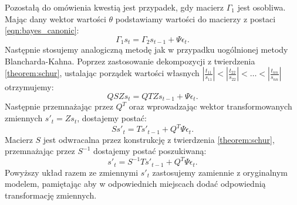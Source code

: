 Pozostałą do omówienia kwestią jest przypadek, gdy macierz $\Gamma_1$  jest osobliwa. Mając dany wektor wartości $\theta$ podstawiamy wartości do macierzy z postaci \eqref{eqn:bayes_canonic}:
\begin{equation}
    \Gamma_1 s_t = \Gamma_2 s_{t-1} + \Psi \epsilon_t.
\end{equation}
Następnie stosujemy analogiczną metodę jak w przypadku uogólnionej metody Blancharda-Kahna. Poprzez zastosowanie dekompozycji z twierdzenia \ref{theorem:schur}, ustalając porządek wartości własnych $|\frac{t_{11}}{s_{11}}| < |\frac{t_{22}}{s_{22}}| < \dots < |\frac{t_{nn}}{s_{nn}}|$ otrzymujemy:
\begin{equation}
    Q S Z s_t = Q T Z s_{t-1} + \Psi \epsilon_t.
\end{equation}
Następnie przemnażając przez $Q^T$ oraz wprowadzając wektor transformowanych zmiennych $s'_t = Z s_{t}$, dostajemy postać:
\begin{equation}
    S s'_t = T s'_{t-1} + Q^T \Psi \epsilon_t.
\end{equation}
Macierz $S$ jest odwracalna przez konstrukcję z twierdzenia \ref{theorem:schur}, przemnażając przez $S^{-1}$ dostajemy postać poszukiwaną:
\begin{equation}
    s'_t = S^{-1} T s'_{t-1} + Q^T \Psi \epsilon_t.
\end{equation}
Powyższy układ razem ze zmiennymi $s'_t$ zastosujemy zamiennie z oryginalnym modelem, pamiętając aby w odpowiednich miejscach dodać odpowiednią transformację zmiennych.

